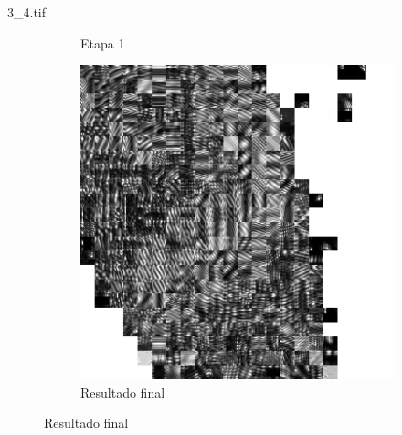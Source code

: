 \documentclass{beamer}
\begin{document}
\begin{frame}{3\_4.tif}
\begin{figure}
\begin{subfigure}[!ht]{0.32\textwidth}
                \caption{Etapa 1}
            \end{subfigure}
            \begin{subfigure}[!ht]{0.32\textwidth}
                \includegraphics[width=\columnwidth]{Fingerprints/3_4_final.jpg}
                \caption{Resultado final}
            \end{subfigure}
        \end{figure}
    \end{frame}
\end{document}
